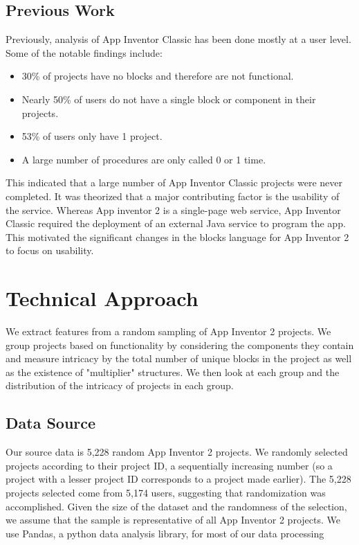 \documentclass[conference]{IEEEtran}
\begin{document}
\subsection{Previous Work}
Previously, analysis of App Inventor Classic has been done mostly at a user level. Some of the notable findings include:
\begin{itemize}
	\item 30\% of projects have no blocks and therefore are not functional.
	\item Nearly 50\% of users do not have a single block or component in their projects.
	\item 53\% of users only have 1 project.
	\item A large number of procedures are only called 0 or 1 time.
\end{itemize}
This indicated that a large number of App Inventor Classic projects were never completed. It was theorized that a major contributing factor is the usability of the service. Whereas App inventor 2 is a single-page web service, App Inventor Classic required the deployment of an external Java service to program the app. This motivated the significant changes in the blocks language for App Inventor 2 to focus on usability.

\section{Technical Approach}

We extract features from a random sampling of App Inventor 2 projects. We group projects based on functionality by considering the components they contain and measure intricacy by the total number of unique blocks in the project as well as the existence of "multiplier" structures. We then look at each group and the distribution of the intricacy of projects in each group.

\subsection{Data Source}
Our source data is 5,228 random App Inventor 2 projects. We randomly selected projects according to their project ID, a sequentially increasing number (so a project with a lesser project ID corresponds to a project made earlier). The 5,228 projects selected come from 5,174 users, suggesting that randomization was accomplished. Given the size of the dataset and the randomness of the selection, we assume that the sample is representative of all App Inventor 2 projects. We use Pandas, a python data analysis library, for most of our data processing 
\end{document}
